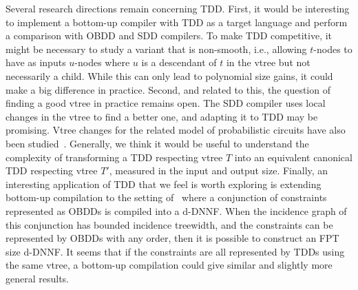 \documentclass[a4paper,UKenglish,cleveref, autoref, thm-restate]{lipics-v2021}
\newcommand{\iflorent}[1]{\todo[inline,color=green]{Florent: #1}}
\newcommand{\iguy}[1]{\todo[inline,color=purple]{\color{white}{{\bf Guy}: #1}}}
\begin{document}
Several research directions remain concerning TDD. First, it would be interesting to implement a bottom-up compiler with TDD as a target language and perform a comparison with OBDD and SDD compilers. To make TDD competitive, it might be necessary to study a variant that is non-smooth, i.e., allowing $t$-nodes to have as inputs $u$-nodes where $u$ is a descendant of $t$ in the vtree but not necessarily a child. While this can only lead to polynomial size gains, it could make a big difference in practice. Second, and related to this, the question of finding a good vtree in practice remains open. The SDD compiler uses local changes in the vtree to find a better one, and adapting it to TDD may be promising. Vtree changes for the related model of probabilistic circuits have also been studied~\cite{ZhangWAB25}. Generally, we think it would be useful to understand the complexity of transforming a TDD respecting vtree $T$ into an equivalent canonical TDD respecting vtree $T'$, measured in the input and output size.
Finally, an interesting application of TDD that we feel is worth exploring is extending bottom-up compilation to the setting of~\cite{ColnetSZ24} where a conjunction of constraints represented as OBDDs is compiled into a d-DNNF. When the incidence graph of this conjunction has bounded incidence treewidth, and the constraints can be represented by OBDDs with any order, then it is possible to construct an FPT size d-DNNF. It seems that if the constraints are all represented by TDDs using the same vtree, a bottom-up compilation could give similar and slightly more general results. 



\end{document}
